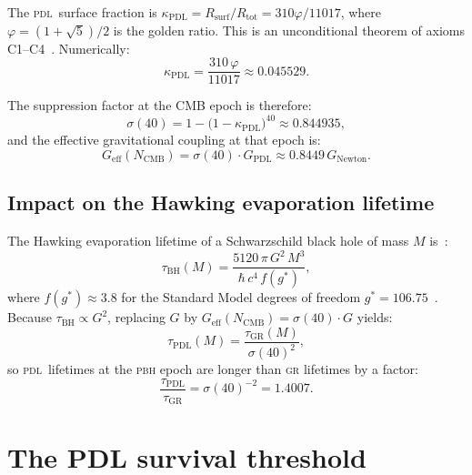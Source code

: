 \documentclass[12pt, a4paper]{article}
\theoremstyle{definition}
\newcommand{\PDL}{\textsc{pdl}}
\newcommand{\Rtot}{R_{\mathrm{tot}}}
\newcommand{\Rsurf}{R_{\mathrm{surf}}}
\newcommand{\Geff}{G_{\mathrm{eff}}}
\newcommand{\GPDL}{G_{\mathrm{PDL}}}
\newcommand{\kappaPDL}{\kappa_{\mathrm{PDL}}}
\newcommand{\NCMB}{N_{\mathrm{CMB}}}
\newcommand{\phigold}{\varphi}
\begin{document}
The \PDL\ surface fraction is $\kappaPDL = \Rsurf/\Rtot = 310\phigold/11017$, where $\phigold = (1+\sqrt{5})/2$ is the golden ratio. This is an unconditional theorem of axioms C1--C4~\cite{D42}. Numerically:
\begin{equation}
  \kappaPDL = \frac{310\,\phigold}{11017} \approx 0.045529.
\end{equation}

The suppression factor at the CMB epoch is therefore:
\begin{equation}
  \sigma(40) = 1 - \bigl(1 - \kappaPDL\bigr)^{40} \approx 0.844935,
  \label{eq:sigma40}
\end{equation}
and the effective gravitational coupling at that epoch is:
\begin{equation}
  \Geff(\NCMB) = \sigma(40)\cdot\GPDL \approx 0.8449\,G_{\mathrm{Newton}}.
\end{equation}

\subsection{Impact on the Hawking evaporation lifetime}

The Hawking evaporation lifetime of a Schwarzschild black hole of mass $M$ is~\cite{Hawking1975,MacGibbon1991}:
\begin{equation}
  \tau_{\mathrm{BH}}(M) = \frac{5120\,\pi\,G^2\,M^3}{\hbar\,c^4\,f(g^*)},
  \label{eq:tau}
\end{equation}
where $f(g^*) \approx 3.8$ for the Standard Model degrees of freedom $g^* = 106.75$~\cite{Carr2021}. Because $\tau_{\mathrm{BH}} \propto G^2$, replacing $G$ by $\Geff(\NCMB) = \sigma(40)\cdot G$ yields:
\begin{equation}
  \tau_{\mathrm{PDL}}(M) = \frac{\tau_{\mathrm{GR}}(M)}{\sigma(40)^2},
  \label{eq:tau_PDL}
\end{equation}
so \PDL\ lifetimes at the \textsc{pbh} epoch are longer than \textsc{gr} lifetimes by a factor:
\begin{equation}
  \frac{\tau_{\mathrm{PDL}}}{\tau_{\mathrm{GR}}} = \sigma(40)^{-2} = 1.4007.
\end{equation}

\section{The PDL survival threshold}
\end{document}
